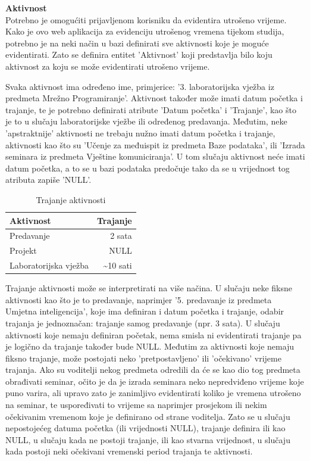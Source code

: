\documentclass[times, utf8, zavrsni]{fer}
\begin{document}
\textbf{Aktivnost}\\
Potrebno je omogućiti prijavljenom korisniku da evidentira utrošeno vrijeme. Kako je ovo web aplikacija za evidenciju utrošenog vremena tijekom studija, potrebno je na neki način u bazi definirati sve aktivnosti koje je moguće evidentirati. Zato se definira entitet 'Aktivnost' koji predstavlja bilo koju aktivnost za koju se može evidentirati utrošeno vrijeme.

Svaka aktivnost ima određeno ime, primjerice: '3. laboratorijska vježba iz predmeta Mrežno Programiranje'. Aktivnost također može imati datum početka i trajanje, te je potrebno definirati atribute 'Datum početka' i 'Trajanje', kao što je to u slučaju laboratorijske vježbe ili određenog predavanja. Međutim, neke 'apstraktnije' aktivnosti ne trebaju nužno imati datum početka i trajanje, aktivnosti kao što su 'Učenje za međuispit iz predmeta Baze podataka', ili 'Izrada seminara iz predmeta Vještine komuniciranja'. U tom slučaju aktivnost neće imati datum početka, a to se u bazi podataka predočuje tako da se u vrijednost tog atributa zapiše 'NULL'.

\begin{table}[H]
\caption{Trajanje aktivnosti}
\label{tbl:tablica-trajanje}
\centering
\begin{tabular}{lr} \hline
Aktivnost & Trajanje\\ \hline
Predavanje & 2 sata\\ 
Projekt & NULL\\
Laboratorijska vježba & \textasciitilde10 sati\\
\end{tabular}
\end{table}

Trajanje aktivnosti može se interpretirati na više načina. U slučaju neke fiksne aktivnosti kao što je to predavanje, naprimjer '5. predavanje iz predmeta Umjetna inteligencija', koje ima definiran i datum početka i trajanje, odabir trajanja je jednoznačan: trajanje samog predavanje (npr. 3 sata). U slučaju aktivnosti koje nemaju definiran početak, nema smisla ni evidentirati trajanje pa je logično da trajanje također bude NULL. Međutim za aktivnosti koje nemaju fiksno trajanje, može postojati neko 'pretpostavljeno' ili 'očekivano' vrijeme trajanja. Ako su voditelji nekog predmeta odredili da će se kao dio tog predmeta obrađivati seminar, očito je da je izrada seminara neko nepredviđeno vrijeme koje puno varira, ali upravo zato je zanimljivo evidentirati koliko je vremena utrošeno na seminar, te uspoređivati to vrijeme sa naprimjer prosjekom ili nekim očekivanim vremenom koje je definirano od strane voditelja. Zato se u slučaju nepostojećeg datuma početka (ili vrijednosti NULL), trajanje definira ili kao NULL, u slučaju kada ne postoji trajanje, ili kao stvarna vrijednost, u slučaju kada postoji neki očekivani vremenski period trajanja te aktivnosti.
\end{document}
